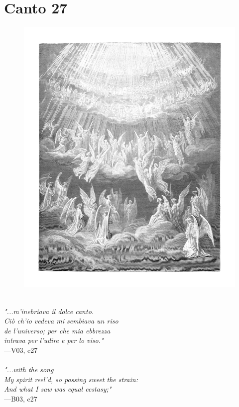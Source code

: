 \documentclass[../Dore_vision.tex]{subfiles}
\begin{document}
\newpage

\section{Canto 27}

\begin{figure}[ht]
\centering
\includegraphics[height=\figsize]{illustrations/book_3/V03, c27.jpg}
\end{figure}

\begin{center}
\begin{minipage}{0.8\linewidth}
\textit{\\
"...m’inebriava il dolce canto.\\Ci\`o ch’io vedeva mi sembiava un riso\\de l’universo; per che mia ebbrezza\\intrava per l’udire e per lo viso."} \\
—V03, c27 \\~\\
\textit{"...with the song\\My spirit reel'd, so passing sweet the strain:\\And what I saw was equal ecstasy;"} \\
—B03, c27
\end{minipage}
\end{center}
\end{document}
